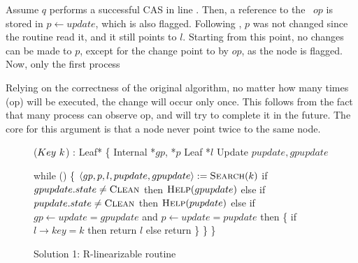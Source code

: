Assume $q$ performs a successful CAS in line . Then, a reference to the \IFlag\ $op$ is stored in $p\leftarrow update$, which is also flagged. Following \argNodeUpdate, $p$ was not changed since the  routine read it, and it still points to $l$.
Starting from this point, no changes can be made to $p$, except for the change point to by $op$, as the node is flagged. Now, only the first process 

Relying on the correctness of the original algorithm, no matter how many times (op) will be executed, the change will occur only once. This follows from the fact that many process can observe op, and will try to complete it in the future. The core for this argument is that a node never point twice to the same node.










\begin{figure*}[h]
	\footnotesize
	
	\begin{code}
		($Key\ k$) : Leaf* \{ \nlc
		\n Internal *$gp$, *$p$\nlc
		Leaf *$l$\nlc
		Update $pupdate, gpupdate$\bl
		\nlc
		
		while (\TRUE) \{ \nlc \n
		$\langle gp, p, l, pupdate, gpupdate \rangle := \mbox{\sc Search}(k)$\nlc
		if $gpupdate.state \neq \mbox{\sc Clean}$ then $\mbox{\sc Help}(gpupdate)$ \nlc
		else if $pupdate.state \neq \mbox{\sc Clean}$ then $\mbox{\sc Help}(pupdate)$ \nlc
		else if $gp \leftarrow update = gpupdate$ and $p \leftarrow update = pupdate$ then \{ \nlc \n
		if $l \rightarrow key = k$ then return $l$ \nlc
		else return \NULL \nlc
		\p \} \nlc
		\p \} \nlc
		\p \}
	\end{code}
	
	\caption{Solution 1: R-linearizable  routine}
	\label{robust find - solution 1}
\end{figure*}



